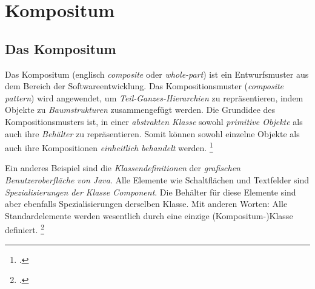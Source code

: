 \documentclass{lehramt-informatik-haupt}
\begin{document}

\chapter{Kompositum}

\begin{quellen}
\item \cite{wiki:kompositum}
\item \cite[Seite 139-147]{gof}
\item \cite[Seite 102-104]{eilebrecht}
\item \cite[Kapitel 14, Seite 173]{siebler}
\end{quellen}

\section{Das Kompositum}

Das Kompositum (englisch \emph{composite} oder \emph{whole-part}) ist
ein Entwurfsmuster aus dem Bereich der Softwareentwicklung. Das
Kompositionsmuster (\emph{composite pattern}) wird angewendet, um
\emph{Teil-Ganzes-Hierarchien} zu repräsentieren, indem Objekte zu
\emph{Baumstrukturen} zusammengefügt werden. Die Grundidee des
Kompositionsmusters ist, in einer \emph{abstrakten Klasse} sowohl
\emph{primitive Objekte} als auch ihre \emph{Behälter} zu
repräsentieren. Somit können sowohl einzelne Objekte als auch ihre
Kompositionen \emph{einheitlich behandelt} werden.
\footcite{aud:fs:4}

Ein anderes Beispiel sind die \emph{Klassendefinitionen} der
\emph{grafischen Benutzeroberfläche von Java}. Alle Elemente wie
Schaltflächen und Textfelder sind \emph{Spezialisierungen der Klasse
Component}. Die Behälter für diese Elemente sind aber ebenfalls
Spezialisierungen derselben Klasse. Mit anderen Worten: Alle
Standardelemente werden wesentlich durch eine einzige
(Kompositum-)Klasse definiert.
\footcite{wiki:kompositum}

\begin{center}
\end{center}
\end{document}
